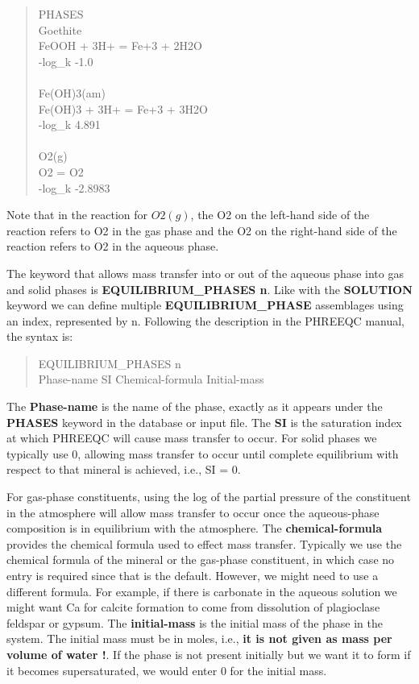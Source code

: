 \begin{quote}
{\color{red}PHASES \\
Goethite \\
FeOOH  +  3H+  =  Fe+3  +  2H2O \\
-log\_k	-1.0 \\
\\
Fe(OH)3(am) \\
Fe(OH)3  +  3H+  =  Fe+3  +  3H2O \\
-log\_k	4.891 \\
\\
O2(g) \\
O2  =  O2 \\
-log\_k	-2.8983 }\\
\end{quote} 

Note that in the reaction for $O2(g)$, the O2 on the left-hand side of the reaction 
refers to O2 in the gas phase and the O2 on the right-hand side of 
the reaction refers to O2 in the aqueous phase.

The keyword that allows mass transfer into or out of the aqueous phase into gas 
and solid phases is {\color{red} \textbf{EQUILIBRIUM\_PHASES n}}. 
Like with the {\color{red} \textbf{SOLUTION}} keyword we can define multiple 
{\color{red} \textbf{EQUILIBRIUM\_PHASE}} assemblages using an index, represented by n.  
Following the description in the PHREEQC manual, the syntax is:

\begin{quote}
{\color{red}EQUILIBRIUM\_PHASES n \\
Phase-name	SI	Chemical-formula	Initial-mass} \\
\end{quote}

The {\color{red} \textbf{Phase-name}} is the name of the phase, exactly as it appears under the 
{\color{red} \textbf{PHASES}} keyword in the database or input file.  
The {\color{red} \textbf{SI}} is the saturation index at which PHREEQC will cause mass transfer to occur.  
For solid phases we typically use 0, allowing mass transfer 
to occur until complete equilibrium with respect to that mineral is achieved, i.e., SI = 0.  

\par For gas-phase constituents, using the log of the partial pressure of the constituent 
in the atmosphere will allow mass transfer to occur once the aqueous-phase composition 
is in equilibrium with the atmosphere. 
The {\color{red} \textbf{chemical-formula}} provides the chemical formula used to effect mass transfer.  
Typically we use the chemical formula of the mineral or the gas-phase constituent, 
in which case no entry is required since that is the default.  
However, we might need to use a different formula.  
For example, if there is carbonate in the aqueous solution we might want Ca for calcite formation 
to come from dissolution of plagioclase feldspar or gypsum.  
The {\color{red} \textbf{initial-mass}} is the initial mass of the phase in the system.  
The initial mass must be in moles, i.e., {\color{red} \textbf{it is not given as mass per volume of water !}}.  
If the phase is not present initially but we want it to form 
if it becomes supersaturated, we would enter 0 for the initial mass.



